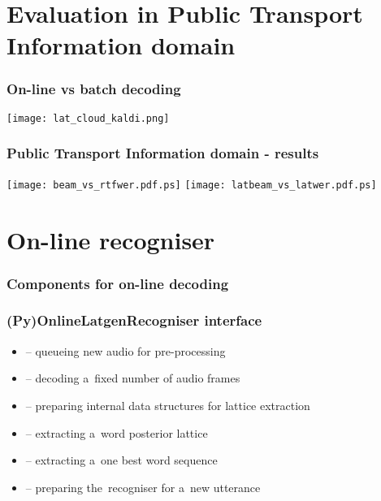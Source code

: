 \section[Evaluation in PTI]{Evaluation in Public Transport Information domain}%

\begin{frame}\frametitle{On-line vs batch decoding} 
    \begin{center}
        \texttt{[image: lat\_cloud\_kaldi.png]}
    \end{center}
\end{frame}

\begin{frame}\frametitle{Public Transport Information domain - results} 
    \texttt{[image: beam\_vs\_rtfwer.pdf.ps]}
    \texttt{[image: latbeam\_vs\_latwer.pdf.ps]}
\end{frame}


\section{On-line recogniser} %

\begin{frame}\frametitle{Components for on-line decoding} 
    \begin{center}
        
    \end{center}
\end{frame}

\begin{frame}\frametitle{(Py)OnlineLatgenRecogniser interface} 
    \begin{itemize}
        \item {} -- queueing new audio for pre-processing
        \item {} -- decoding a~fixed number of audio frames
        \item {} -- preparing internal data structures for lattice extraction
        \item {} -- extracting a~word posterior lattice
        \item {} -- extracting a~one best word sequence
        \item {} -- preparing the~recogniser for a~new utterance
    \end{itemize}
\end{frame}

